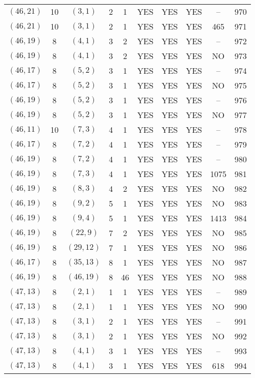 \begin{longtable}{|c|c|c|c|c|c|c|c|c|c|}
$(46, 21)$ & 10 & $(3, 1)$ & 2 & 1 & YES & YES & YES & -- & 970\\
$(46, 21)$ & 10 & $(3, 1)$ & 2 & 1 & YES & YES & YES & 465 & 971\\
$(46, 19)$ & 8 & $(4, 1)$ & 3 & 2 & YES & YES & YES & -- & 972\\
$(46, 19)$ & 8 & $(4, 1)$ & 3 & 2 & YES & YES & YES & NO & 973\\
$(46, 17)$ & 8 & $(5, 2)$ & 3 & 1 & YES & YES & YES & -- & 974\\
$(46, 17)$ & 8 & $(5, 2)$ & 3 & 1 & YES & YES & YES & NO & 975\\
$(46, 19)$ & 8 & $(5, 2)$ & 3 & 1 & YES & YES & YES & -- & 976\\
$(46, 19)$ & 8 & $(5, 2)$ & 3 & 1 & YES & YES & YES & NO & 977\\
$(46, 11)$ & 10 & $(7, 3)$ & 4 & 1 & YES & YES & YES & -- & 978\\
$(46, 17)$ & 8 & $(7, 2)$ & 4 & 1 & YES & YES & YES & -- & 979\\
$(46, 19)$ & 8 & $(7, 2)$ & 4 & 1 & YES & YES & YES & -- & 980\\
$(46, 19)$ & 8 & $(7, 3)$ & 4 & 1 & YES & YES & YES & 1075 & 981\\
$(46, 19)$ & 8 & $(8, 3)$ & 4 & 2 & YES & YES & YES & NO & 982\\
$(46, 19)$ & 8 & $(9, 2)$ & 5 & 1 & YES & YES & YES & NO & 983\\
$(46, 19)$ & 8 & $(9, 4)$ & 5 & 1 & YES & YES & YES & 1413 & 984\\
$(46, 19)$ & 8 & $(22, 9)$ & 7 & 2 & YES & YES & YES & NO & 985\\
$(46, 19)$ & 8 & $(29, 12)$ & 7 & 1 & YES & YES & YES & NO & 986\\
$(46, 17)$ & 8 & $(35, 13)$ & 8 & 1 & YES & YES & YES & NO & 987\\
$(46, 19)$ & 8 & $(46, 19)$ & 8 & 46 & YES & YES & YES & NO & 988\\
$(47, 13)$ & 8 & $(2, 1)$ & 1 & 1 & YES & YES & YES & -- & 989\\
$(47, 13)$ & 8 & $(2, 1)$ & 1 & 1 & YES & YES & YES & NO & 990\\
$(47, 13)$ & 8 & $(3, 1)$ & 2 & 1 & YES & YES & YES & -- & 991\\
$(47, 13)$ & 8 & $(3, 1)$ & 2 & 1 & YES & YES & YES & NO & 992\\
$(47, 13)$ & 8 & $(4, 1)$ & 3 & 1 & YES & YES & YES & -- & 993\\
$(47, 13)$ & 8 & $(4, 1)$ & 3 & 1 & YES & YES & YES & 618 & 994\\

\end{longtable}
